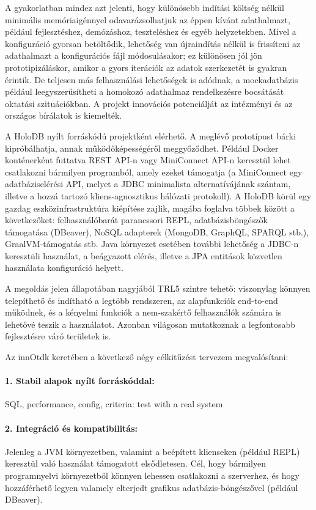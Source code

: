 \documentclass[12pt]{article}
\begin{document}
A gyakorlatban mindez azt jelenti, hogy különösebb indítási költség nélkül minimális memóriaigénnyel odavarázsolhatjuk az éppen kívánt adathalmazt, például fejlesztéshez, demózáshoz, teszteléshez és egyéb helyzetekben.
Mivel a konfiguráció gyorsan betöltődik, lehetőség van újraindítás nélkül is frissíteni az adathalmazt a konfigurációs fájl módosulásakor; ez különösen jól jön prototipizáláskor, amikor a gyors iterációk az adatok szerkezetét is gyakran érintik.
De teljesen más felhasználási lehetőségek is adódnak, a mockadatbázis például leegyszerűsítheti a homokozó adathalmaz rendelkezésre bocsátását oktatási szituációkban.
A projekt innovációs potenciálját az intézményi és az országos bírálatok is kiemelték.

A HoloDB nyílt forráskódú projektként elérhető.
A meglévő prototípust bárki kipróbálhatja, annak működőképességéről meggyőződhet.
Például Docker konténerként futtatva REST API-n vagy MiniConnect API-n keresztül lehet csatlakozni bármilyen programból, amely ezeket támogatja
(a MiniConnect egy adatbáziselérési API, melyet a JDBC minimalista alternatívájának szántam, illetve a hozzá tartozó kliens-agnosztikus hálózati protokoll).
A HoloDB körül egy gazdag eszközinfrastruktúra kiépítése zajlik, magába foglalva többek között a következőket: felhasználóbarát parancssori REPL, adatbázisböngészők támogatása (DBeaver), NoSQL adapterek (MongoDB, GraphQL, SPARQL stb.), GraalVM-támogatás stb.
Java környezet esetében további lehetőség a JDBC-n keresztüli használat,
a beágyazott elérés, illetve a JPA entitások közvetlen használata konfiguráció helyett.

A megoldás jelen állapotában nagyjából TRL5 szintre tehető:
viszonylag könnyen telepíthető és indítható a legtöbb rendszeren,
az alapfunkciók end-to-end működnek,
és a kényelmi funkciók a nem-szakértő felhasználók számára is lehetővé teszik a használatot.
Azonban világosan mutatkoznak a legfontosabb fejlesztésre váró területek is.

Az innOtdk keretében a következő négy célkitűzést tervezem megvalósítani:

\paragraph{1. Stabil alapok nyílt forráskóddal:}{
SQL, performance, config, criteria: test with a real system
}

\paragraph{2. Integráció és kompatibilitás:}{
Jelenleg a JVM környezetben, valamint a beépített klienseken (például REPL) keresztül való használat támogatott elsődletesen.
Cél, hogy bármilyen programnyelvi környezetből könnyen lehessen csatlakozni a szerverhez,
és hogy hozzáférhető legyen valamely elterjedt grafikus adatbázis-böngészővel (például DBeaver).
}
\end{document}
